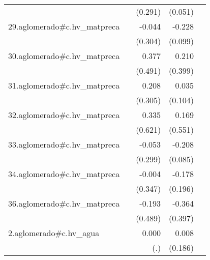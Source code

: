 {\begin{longtable}{l*{4}{D{.}{.}{-1}}}
            &                     &     (0.291)         &     (0.051)         &                     \\
\addlinespace
29.aglomerado#c.hv\_matpreca&                     &      -0.044         &      -0.228\sym{*}  &                     \\
            &                     &     (0.304)         &     (0.099)         &                     \\
\addlinespace
30.aglomerado#c.hv\_matpreca&                     &       0.377         &       0.210         &                     \\
            &                     &     (0.491)         &     (0.399)         &                     \\
\addlinespace
31.aglomerado#c.hv\_matpreca&                     &       0.208         &       0.035         &                     \\
            &                     &     (0.305)         &     (0.104)         &                     \\
\addlinespace
32.aglomerado#c.hv\_matpreca&                     &       0.335         &       0.169         &                     \\
            &                     &     (0.621)         &     (0.551)         &                     \\
\addlinespace
33.aglomerado#c.hv\_matpreca&                     &      -0.053         &      -0.208\sym{*}  &                     \\
            &                     &     (0.299)         &     (0.085)         &                     \\
\addlinespace
34.aglomerado#c.hv\_matpreca&                     &      -0.004         &      -0.178         &                     \\
            &                     &     (0.347)         &     (0.196)         &                     \\
\addlinespace
36.aglomerado#c.hv\_matpreca&                     &      -0.193         &      -0.364         &                     \\
            &                     &     (0.489)         &     (0.397)         &                     \\
\addlinespace
2.aglomerado#c.hv\_agua&                     &       0.000         &       0.008         &                     \\
            &                     &         (.)         &     (0.186)         &                     \\

\end{longtable}}
